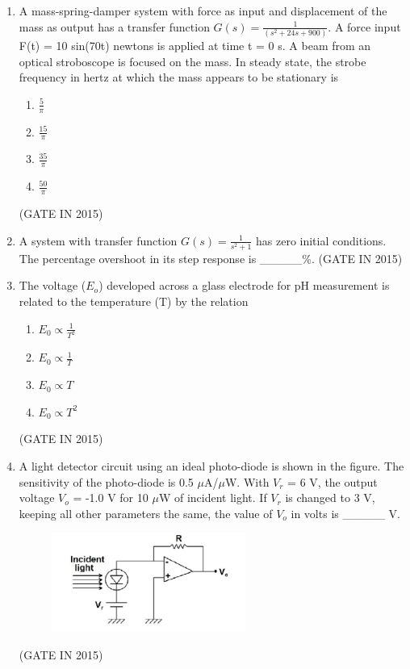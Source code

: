 \documentclass[journal]{IEEEtran}
\begin{document}
\begin{enumerate}
\item A mass-spring-damper system with force as input and displacement of the mass as output has a transfer function $G(s) = \frac{1}{(s^2 + 24s + 900)}$. A force input F(t) = 10 sin(70t) newtons is applied at time t = 0 s. A beam from an optical stroboscope is focused on the mass. In steady state, the strobe frequency in hertz at which the mass appears to be stationary is

\begin{multicols}{4}
\begin{enumerate}
\item $\frac{5}{\pi}$
\item $\frac{15}{\pi}$
\item $\frac{35}{\pi}$
\item $\frac{50}{\pi}$
\end{enumerate}
  \end{multicols} \hfill(GATE IN 2015)

\item A system with transfer function $G(s) = \frac{1}{s^2+1}$ has zero initial conditions. The percentage overshoot in its step response is \_\_\_\_\_\%.
 \hfill(GATE IN 2015)

\item The voltage ($E_o$) developed across a glass electrode for pH measurement is related to the temperature (T) by the relation

\begin{multicols}{4}
\begin{enumerate}
\item $E_0 \propto \frac{1}{T^2}$
\item $E_0 \propto \frac{1}{T}$
\item $E_0 \propto T$
\item $E_0 \propto T^2$
\end{enumerate}
  \end{multicols} \hfill(GATE IN 2015)

\item A light detector circuit using an ideal photo-diode is shown in the figure. The sensitivity of the photo-diode is 0.5 $\mu$A/$\mu$W. With $V_r$  = 6 V, the output voltage $V_o$ = -1.0 V for 10 $\mu$W of incident light. If $V_r$ is changed to 3 V, keeping all other parameters the same, the value of $V_o$  in volts is \_\_\_\_\_ V.
\begin{figure}[H]
    \centering
      \includegraphics[width=0.6\textwidth]{11.png} 
      \caption{}
    \label{fig:fig11} 
\end{figure}
 \hfill(GATE IN 2015)


\end{enumerate}
\end{document}
